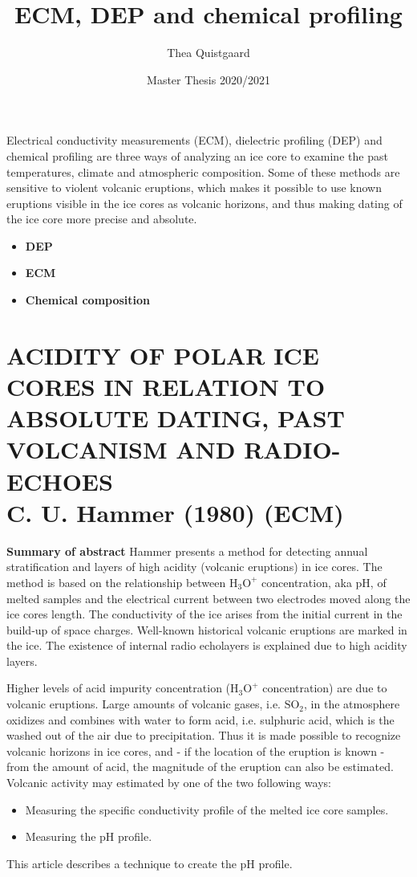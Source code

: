 \documentclass[11pt]{article}
\title{ECM, DEP and chemical profiling}
\author{Thea Quistgaard}
\date{Master Thesis 2020/2021}
\begin{document}
\maketitle
Electrical conductivity measurements (ECM), dielectric profiling (DEP) and chemical profiling are three ways of analyzing an ice core to examine the past temperatures, climate and atmospheric composition. Some of these methods are sensitive to violent volcanic eruptions, which makes it possible to use known eruptions visible in the ice cores as volcanic horizons, and thus making dating of the ice core more precise and absolute.
\begin{itemize}
	\item \textbf{DEP}
	\item \textbf{ECM}
	\item \textbf{Chemical composition}
\end{itemize}

\section{ACIDITY OF POLAR ICE CORES IN RELATION TO ABSOLUTE DATING, PAST VOLCANISM AND RADIO-ECHOES\\ C. U. Hammer (1980) (ECM)}
\textbf{Summary of abstract} Hammer presents a method for detecting annual stratification and layers of high acidity (volcanic eruptions) in ice cores. The method is based on the relationship between $\text{H}_3\text{O}^+$ concentration, aka pH, of melted samples and the electrical current between two electrodes moved along the ice cores length. The conductivity of the ice arises from the initial current in the build-up of space charges. Well-known historical volcanic  eruptions are marked in the ice. The existence of internal radio echo\footnotemark layers is explained due to high acidity layers. \\

Higher levels of acid impurity concentration ($\text{H}_3 \text{O}^+$ concentration) are due to volcanic eruptions. Large amounts of volcanic gases, i.e. $\text{SO}_2$, in the atmosphere oxidizes and combines with water to form acid, i.e. sulphuric acid, which is the washed out of the air due to precipitation. Thus it is made possible to recognize volcanic horizons in ice cores, and - if the location of the eruption is known - from the amount of acid, the magnitude of the eruption can also be estimated.\\
Volcanic activity may estimated by one of the two following ways:
\begin{itemize}
	\item Measuring the specific conductivity profile of the melted ice core samples.
	\item Measuring the pH profile.
\end{itemize}
This article describes a technique to create the pH profile.
\end{document}
